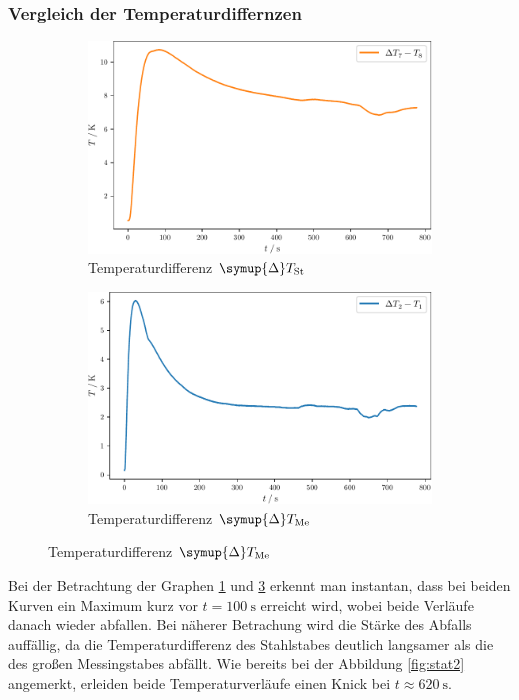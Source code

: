 \subsubsection{Vergleich der Temperaturdiffernzen}
\begin{figure}
  \caption{Differenzenen der Temperaturen der statischen Methode}
  \label{fig:Differenz}
  \begin{subfigure}{0.48\textwidth}
    \centering
    \includegraphics[width = \textwidth]{build/statDifSt.pdf}
    \caption{Temperaturdifferenz $\symup{\Delta}T_\text{St}$}
    \label{fig:statDifSt}
  \end{subfigure}
  \begin{subfigure}{0.48\textwidth}
    \centering
    \includegraphics[width = \textwidth]{build/statDifMek.pdf}
    \caption{Temperaturdifferenz $\symup{\Delta}T_\text{Me}$}
    \label{fig:statDifMek}
  \end{subfigure}
\end{figure}
Bei der Betrachtung der Graphen \ref{fig:statDifSt} und \ref{fig:statDifMek} erkennt man instantan, dass bei beiden
Kurven ein Maximum kurz vor $t = \SI{100}{\second}$ erreicht wird, wobei beide Verläufe danach 
wieder abfallen. Bei näherer Betrachung wird die Stärke des Abfalls auffällig, da die
Temperaturdifferenz des Stahlstabes deutlich langsamer als die des großen Messingstabes abfällt.
Wie bereits bei der Abbildung \ref{fig:stat2} angemerkt, erleiden beide Temperaturverläufe einen Knick bei $t \approx \SI{620}{\second}$.
